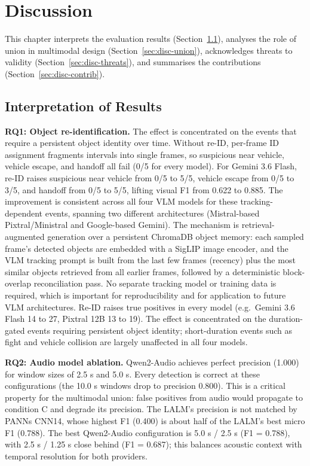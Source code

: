 \chapter{Discussion}
\label{Discussion}

This chapter interprets the evaluation results (Section~\ref{sec:disc-interp}), analyses the role of union in multimodal design (Section~\ref{sec:disc-union}), acknowledges threats to validity (Section~\ref{sec:disc-threats}), and summarises the contributions (Section~\ref{sec:disc-contrib}).

\section{Interpretation of Results}
\label{sec:disc-interp}

\textbf{RQ1: Object re-identification.} The effect is concentrated on the events that require a persistent object identity over time. Without re-ID, per-frame ID assignment fragments intervals into single frames, so suspicious near vehicle, vehicle escape, and handoff all fail (0/5 for every model). For Gemini 3.6 Flash, re-ID raises suspicious near vehicle from 0/5 to 5/5, vehicle escape from 0/5 to 3/5, and handoff from 0/5 to 5/5, lifting visual F1 from 0.622 to 0.885. The improvement is consistent across all four VLM models for these tracking-dependent events, spanning two different architectures (Mistral-based Pixtral/Ministral and Google-based Gemini). The mechanism is retrieval-augmented generation over a persistent ChromaDB object memory: each sampled frame's detected objects are embedded with a SigLIP image encoder, and the VLM tracking prompt is built from the last few frames (recency) plus the most similar objects retrieved from all earlier frames, followed by a deterministic block-overlap reconciliation pass. No separate tracking model or training data is required, which is important for reproducibility and for application to future VLM architectures. Re-ID raises true positives in every model (e.g.\ Gemini 3.6 Flash 14 to 27, Pixtral 12B 13 to 19). The effect is concentrated on the duration-gated events requiring persistent object identity; short-duration events such as fight and vehicle collision are largely unaffected in all four models.

\textbf{RQ2: Audio model ablation.} Qwen2-Audio achieves perfect precision (1.000) for window sizes of 2.5 s and 5.0 s. Every detection is correct at these configurations (the 10.0 s windows drop to precision 0.800). This is a critical property for the multimodal union: false positives from audio would propagate to condition C and degrade its precision. The LALM's precision is not matched by PANNs CNN14, whose highest F1 (0.400) is about half of the LALM's best micro F1 (0.788). The best Qwen2-Audio configuration is 5.0 s / 2.5 s (F1 = 0.788), with 2.5 s / 1.25 s close behind (F1 = 0.687); this balances acoustic context with temporal resolution for both providers.

